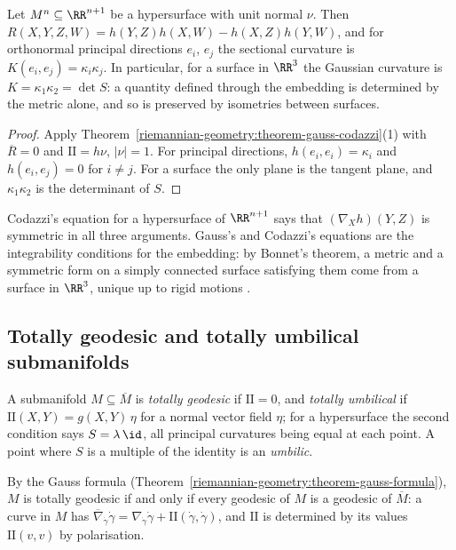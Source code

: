 \begin{corollary}\label{riemannian-geometry:corollary-theorema-egregium}
Let $M^n \subseteq \RR^{n+1}$ be a hypersurface with unit normal $\nu$. Then
$R(X, Y, Z, W) = h(Y, Z)h(X, W) - h(X, Z)h(Y, W)$, and for orthonormal principal directions $e_i$, $e_j$ the sectional curvature is $K(e_i, e_j) = \kappa_i\kappa_j$. In
particular, for a surface in $\RR^3$ the Gaussian curvature is $K = \kappa_1\kappa_2 = \det S$: a quantity defined through the embedding is determined by the metric
alone, and so is preserved by isometries between surfaces.
\end{corollary}

\begin{proof}
Apply Theorem~\ref{riemannian-geometry:theorem-gauss-codazzi}(1) with $\overline{R} = 0$ and $\mathrm{II} = h\nu$, $|\nu| = 1$. For principal directions,
$h(e_i, e_i) = \kappa_i$ and $h(e_i, e_j) = 0$ for $i \neq j$. For a surface the only plane is the tangent plane, and $\kappa_1\kappa_2$ is the determinant of $S$.
\end{proof}

Codazzi's equation for a hypersurface of $\RR^{n+1}$ says that $(\nabla_Xh)(Y, Z)$ is symmetric in all three arguments. Gauss's and Codazzi's equations are the
integrability conditions for the embedding: by Bonnet's theorem, a metric and a symmetric form on a simply connected surface satisfying them come from a surface
in $\RR^3$, unique up to rigid motions \cite[Chapter 4]{do-carmo-curves-surfaces}.

\subsection{Totally geodesic and totally umbilical submanifolds}\label{riemannian-geometry:subsection-umbilical}

\begin{definition}\label{riemannian-geometry:definition-umbilical}
A submanifold $M \subseteq \overline{M}$ is \emph{totally geodesic} if $\mathrm{II} = 0$, and \emph{totally umbilical} if $\mathrm{II}(X, Y) = g(X, Y)\,\eta$ for a normal vector field $\eta$; for a hypersurface
the second condition says $S = \lambda\,\id$, all principal curvatures being equal at each point. A point where $S$ is a multiple of the identity is an \emph{umbilic}.
\end{definition}

By the Gauss formula (Theorem~\ref{riemannian-geometry:theorem-gauss-formula}), $M$ is totally geodesic if and only if every geodesic of $M$ is a geodesic of $\overline{M}$: a curve in $M$ has
$\overline{\nabla}_{\dot\gamma}\dot\gamma = \nabla_{\dot\gamma}\dot\gamma + \mathrm{II}(\dot\gamma, \dot\gamma)$, and $\mathrm{II}$ is determined by its values $\mathrm{II}(v, v)$ by polarisation.

